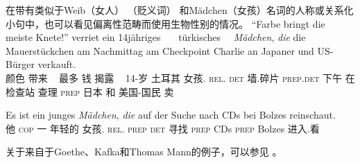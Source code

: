 \zl
在带有类似于Weib（女人） （贬义词） 和Mädchen（女孩）名词的人称或关系化小句中，也可以看见偏离性范畴而使用生物性别的情况。
\eal
\ex 
\gll "`Farbe bringt die meiste Knete!"' verriet ein 14jähriges~~~ türkisches~~ \emph{Mädchen}, \emph{die} die Mauerstückchen am      Nachmittag am Checkpoint Charlie an Japaner und US-Bürger verkauft.\footnotemark\\
颜色 带来 \deter~ 最多 钱 揭露 \deter~ 14-岁  土耳其 女孩.\neu{} \textsc{rel}.\fem{} \textsc{det} 墙.碎片
\textsc{prep}.\textsc{det} 下午 在 检查站 查理 \textsc{prep} 日本 和 美国-国民 卖\\  
\ex 
{\raggedright
\gll Es ist ein junges {\em Mädchen\/}, {\em die\/} auf der Suche nach CDs bei Bolzes reinschaut.\footnotemark\\
	 他 \textsc{cop} 一 年轻的 女孩.\neu{} \textsc{rel}.\fem{} \textsc{prep} \textsc{det} 寻找 \textsc{prep} CDs \textsc{prep} Bolzes 进入.看\\
\par}
\zl
关于来自于Goethe、Kafka和Thomas Mann的例子，可以参见 。

